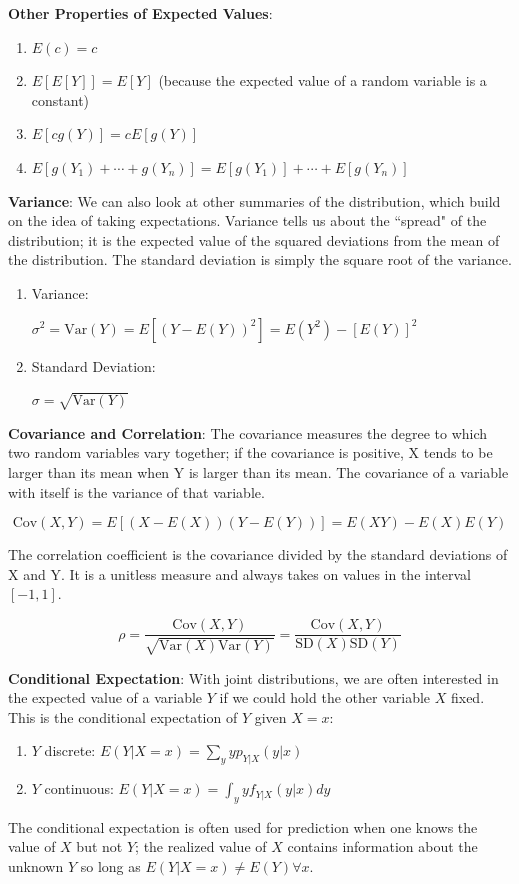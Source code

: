 \documentclass[11pt]{article}
\newcommand{\be}{\begin{enumerate}}
\newcommand{\ee}{\end{enumerate}}
\newcommand{\pbof}{\parbox[t]{1.5in}}
\newcommand{\Var}{\mathrm{Var}}
\newcommand{\SD}{\mathrm{SD}}
\newcommand{\Cov}{\mathrm{Cov}}
\begin{document}
\item {\bf Other Properties of Expected Values}:
  \be
  \item $E(c)=c$
  \item $E[E[Y]] = E[Y]$ (because the expected value of a random variable is a constant)
  \item $E[c g(Y)]= c E[g(Y)]$
  \item $E[g(Y_1) + \cdots + g(Y_n)]=E[g(Y_1)]+\cdots+E[g(Y_n)]$
  \ee

\item {\bf Variance}:  We can also look at other summaries of the
distribution, which build on the idea of taking expectations.
Variance tells us about the ``spread" of the distribution; it is the
expected value of the squared deviations from the mean of the
distribution.  The standard deviation is simply the square root of the
variance.
  \be
  \item \pbof{Variance:} $\sigma^2= \Var(Y) = E[(Y - E(Y))^2] =  E(Y^2)-[E(Y)]^2$
  \item \pbof{Standard Deviation:} $\sigma= \sqrt{\Var(Y)}$
  \ee

\item {\bf Covariance and Correlation}: The covariance measures the
  degree to which two random variables vary together; if the
  covariance is positive, X tends to be larger than its mean when Y is
  larger than its mean.  The covariance of a variable with itself is
  the variance of that variable.

$$\Cov(X,Y) = E[(X - E(X))(Y - E(Y))] = E(XY) - E(X)E(Y)$$

The correlation coefficient is the covariance divided by the standard
deviations of X and Y.  It is a unitless measure and always takes on
values in the interval $[-1,1]$.

$$\rho = \frac{\Cov(X,Y)}{\sqrt{\Var(X)\Var(Y)}} = \frac{\Cov(X,Y)}{\SD(X)\SD(Y)}$$


\item {\bf Conditional Expectation}: With joint distributions, we are
  often interested in the expected value of a variable $Y$ if we could
  hold the other variable $X$ fixed.  This is the conditional
  expectation of $Y$ given $X = x$: \be
\item $Y$ discrete:  $E(Y|X = x) = \sum_y yp_{Y|X}(y|x)$
\item $Y$ continuous: $E(Y|X = x) = \int_y yf_{Y|X}(y|x)dy$ \ee The
  conditional expectation is often used for prediction when one knows
  the value of $X$ but not $Y$; the realized value of $X$ contains
  information about the unknown $Y$ so long as $E(Y|X = x) \neq E(Y)
  \forall x$.
\end{document}
